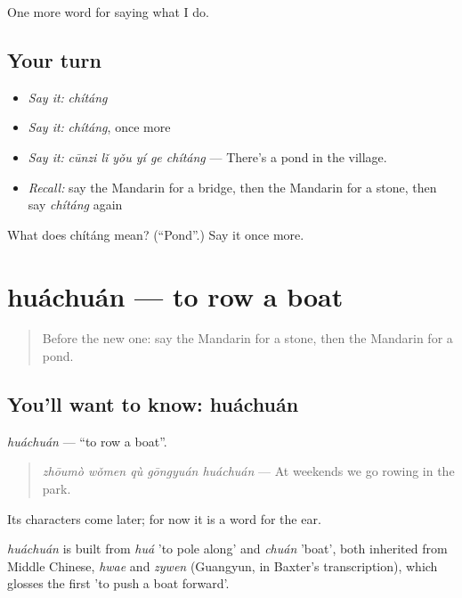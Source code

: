 \begin{grammarlens}[title={What you've built}]
One more word for saying what I do.
\end{grammarlens}

\subsection*{Your turn}
\begin{itemize}
\raggedright
  \item \emph{Say it:} \emph{chítáng}
  \item \emph{Say it:} \emph{chítáng}, once more
  \item \emph{Say it:} \emph{cūnzi lǐ yǒu yí ge chítáng} — There's a pond in the village.
  \item \emph{Recall:} say the Mandarin for a bridge, then the Mandarin for a stone, then say \emph{chítáng} again
\end{itemize}

\begin{tcolorbox}[breakable,colback=teal!4,colframe=teal!35!black,title={Before you move on}]
What does chítáng mean? (\textquotedblleft{}Pond\textquotedblright{}.) Say it once more.
\end{tcolorbox}
\section[huáchuán]{huáchuán — to row a boat}

\label{lesson:ZH-C246-huachuan}



\begin{quote}
Before the new one: say the Mandarin for a stone, then the Mandarin for a pond.
\end{quote}

\subsection*{You'll want to know: huáchuán}
\emph{huáchuán} — \textquotedblleft{}to row a boat\textquotedblright{}.

\begin{quote}
\emph{zhōumò wǒmen qù gōngyuán huáchuán} — At weekends we go rowing in the park.
\end{quote}

Its characters come later; for now it is a word for the ear.

\begin{cousinweb}
\emph{huáchuán} is built from \emph{huá} 'to pole along' and \emph{chuán} 'boat', both inherited from Middle Chinese, \emph{hwae} and \emph{zywen} (Guangyun, in Baxter's transcription), which glosses the first 'to push a boat forward'.
\end{cousinweb}

